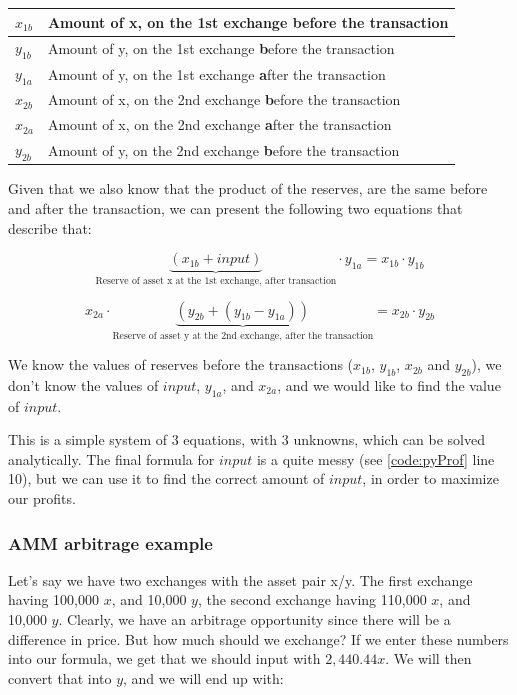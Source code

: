 \begin{table}[h]
\centering
\begin{tabular}{|l|l|}
\hline
$x_{1b}$ & Amount of x, on the 1st exchange \textbf{b}efore the transaction \\
\hline
$y_{1b}$ & Amount of y, on the 1st exchange \textbf{b}efore the transaction \\
\hline
$y_{1a}$ & Amount of y, on the 1st exchange \textbf{a}fter the transaction \\
\hline
$x_{2b}$ & Amount of x, on the 2nd exchange \textbf{b}efore the transaction \\
\hline
$x_{2a}$ & Amount of x, on the 2nd exchange \textbf{a}fter the transaction \\
\hline
$y_{2b}$ & Amount of y, on the 2nd exchange \textbf{b}efore the transaction \\
\hline
\end{tabular}
\end{table}

Given that we also know that the product of the reserves, are the same before and
after the transaction, we can present the following two equations that describe
that:

\begin{equation}
\underbrace{(x_{1b} + input)}_{\text{Reserve of asset x at the 1st exchange, after transaction}} \cdot y_{1a} = x_{1b} \cdot y_{1b}
\end{equation}

\begin{equation}
x_{2a} \cdot \underbrace{(y_{2b} + (y_{1b} - y_{1a}))}_{\text{Reserve of asset y at
the 2nd exchange, after the transaction}} = x_{2b} \cdot y_{2b}
\end{equation}

We know the values of reserves before the transactions ($x_{1b}$, $y_{1b}$,
$x_{2b}$ and $y_{2b}$), we don't know the values of $input$, $y_{1a}$, and
$x_{2a}$, and we would like to find the value of $input$.

This is a simple system of 3 equations, with 3 unknowns, which can be solved
analytically. The final formula for $input$ is a quite messy
(see \ref{code:pyProf} line 10), but we can use it to find the correct amount of
$input$, in order to maximize our profits.

\subsubsection{AMM arbitrage example}
Let's say we have two exchanges with the asset pair x/y. The first exchange having
100,000 $x$, and 10,000 $y$, the second exchange having 110,000 $x$, and 10,000 $y$.
Clearly, we have an arbitrage opportunity since there will be a difference in
price. But how much should we exchange? If we enter these numbers into our
formula, we get that we should input with $2,440.44 x$. We will then convert that
into $y$, and we will end up with:


